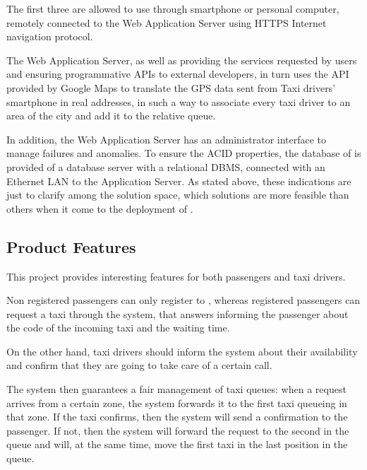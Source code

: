 The first three are allowed to use \myTaxiService{} through smartphone or personal computer, remotely connected to the Web Application Server using HTTPS Internet navigation protocol.\par
The Web Application Server, as well as providing the services requested by users and ensuring programmative APIs to external developers, in turn uses the API provided by Google Maps to translate the GPS data sent from Taxi drivers' smartphone in real addresses, in such a way to associate every taxi driver to an area of ​​the city and add it to the relative queue.\par
In addition, the Web Application Server has an administrator interface to manage failures and anomalies. To ensure the ACID properties, the database of \myTaxiService{} is provided of a database server with a relational DBMS, connected with an Ethernet LAN to the Application Server.
As stated above, these indications are just to clarify among the solution space, which solutions are more feasible than others when it come to the deployment of \myTaxiService{}.
\subsection{Product Features}
This project provides interesting features for both passengers and taxi drivers.\par
Non registered passengers can only register to \myTaxiService{}, whereas registered passengers can request a taxi through the system, that answers informing the passenger about the code of the incoming taxi and the waiting time.\par
On the other hand, taxi drivers should inform the system about their availability and confirm that they are going to take care of a certain call.\par
The system then guarantees a fair management of taxi queues: when a request arrives from a certain zone, the system forwards it to the first taxi queueing in that zone.
If the taxi confirms, then the system will send a confirmation to the passenger.
If not, then the system will forward the request to the second in the queue and will, at the same time, move the first taxi in the last position in the queue.

